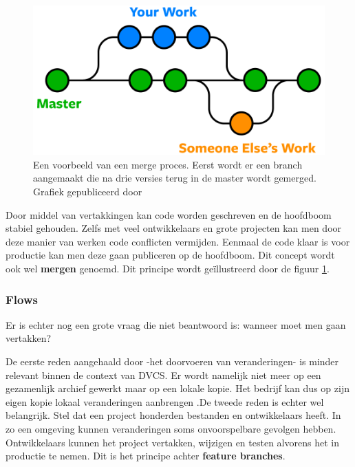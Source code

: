 \begin{figure}
\begin{center}
  	\includegraphics[scale=0.2]{git-branches-merge.png}
\end{center}
\caption[Voorbeeld merge proces.]{Een voorbeeld van een merge proces. Eerst wordt er een branch aangemaakt die na drie versies terug in de master wordt gemerged. Grafiek gepubliceerd door \textcite{NobleDesktop2018}}\label{fig_merge}
\end{figure}

Door middel van vertakkingen kan code worden geschreven en de hoofdboom stabiel gehouden. Zelfs met veel ontwikkelaars en grote projecten kan men door deze manier van werken code conflicten vermijden. Eenmaal de code klaar is voor productie kan men deze gaan publiceren op de hoofdboom. Dit concept wordt ook wel \textbf{mergen} genoemd. Dit principe wordt geïllustreerd door de figuur \ref{fig_merge}.


\subsubsection{Flows}
Er is echter nog een grote vraag die niet beantwoord is: wanneer moet men gaan vertakken?

De eerste reden aangehaald door \textcite{Tichy85rcs} -het doorvoeren van veranderingen- is minder relevant binnen de context van DVCS. Er wordt namelijk niet meer op een gezamenlijk archief gewerkt maar op een lokale kopie. Het bedrijf kan dus op zijn eigen kopie lokaal veranderingen aanbrengen .De tweede reden is echter wel belangrijk. Stel dat een project honderden bestanden en ontwikkelaars heeft. In zo een omgeving kunnen veranderingen soms onvoorspelbare gevolgen hebben. Ontwikkelaars kunnen het project vertakken, wijzigen en testen alvorens het in productie te nemen. Dit is het principe achter \textbf{feature branches}.\\

